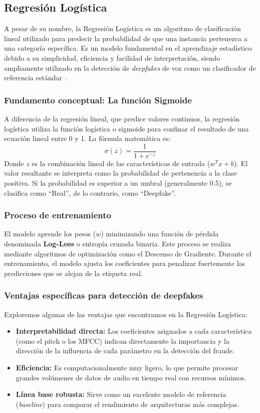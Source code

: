 \subsection{Regresión Logística}
\label{subsubsec:eda_reg_log}
A pesar de su nombre, la Regresión Logística es un algoritmo de clasificación lineal utilizado para predecir la probabilidad de que una instancia pertenezca a una categoría específica. Es un modelo fundamental en el aprendizaje estadístico debido a su simplicidad, eficiencia y facilidad de interpretación, siendo ampliamente utilizado en la detección de \textit{deepfakes} de voz como un clasificador de referencia estándar~\parencite{Alenezi2024}.

\subsubsection*{Fundamento conceptual: La función Sigmoide}
A diferencia de la regresión lineal, que predice valores continuos, la regresión logística utiliza la función logística o sigmoide para confinar el resultado de una ecuación lineal entre 0 y 1. La fórmula matemática es:
$$\sigma(z) = \frac{1}{1 + e^{-z}}$$
Donde $z$ es la combinación lineal de las características de entrada ($w^T x + b$). El valor resultante se interpreta como la probabilidad de pertenencia a la clase positiva. Si la probabilidad es superior a un umbral (generalmente 0.5), se clasifica como ``Real'', de lo contrario, como ``Deepfake''.

\subsubsection*{Proceso de entrenamiento}
El modelo aprende los pesos ($w$) minimizando una función de pérdida denominada \textbf{Log-Loss} o entropía cruzada binaria. Este proceso se realiza mediante algoritmos de optimización como el Descenso de Gradiente. Durante el entrenamiento, el modelo ajusta los coeficientes para penalizar fuertemente las predicciones que se alejan de la etiqueta real.

\subsubsection*{Ventajas específicas para detección de deepfakes}

Exploremos algunas de las ventajas que encontramos en la Regresión Logística:

\begin{itemize}
    \item \textbf{Interpretabilidad directa:} Los coeficientes asignados a cada característica (como el pitch o los MFCC) indican directamente la importancia y la dirección de la influencia de cada parámetro en la detección del fraude.
    \item \textbf{Eficiencia:} Es computacionalmente muy ligero, lo que permite procesar grandes volúmenes de datos de audio en tiempo real con recursos mínimos.
    \item \textbf{Línea base robusta:} Sirve como un excelente modelo de referencia (\textit{baseline}) para comparar el rendimiento de arquitecturas más complejas.
\end{itemize}